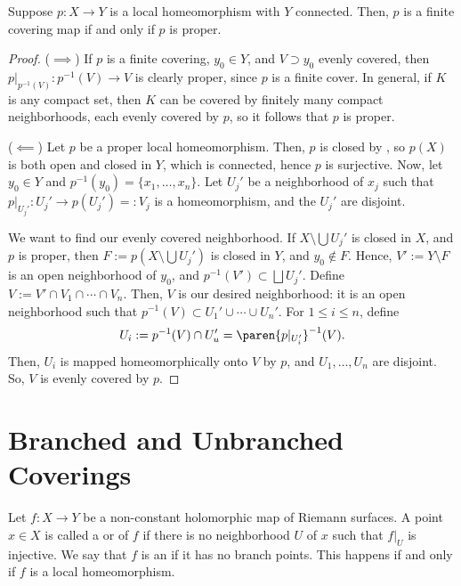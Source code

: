 \documentclass[11pt]{report}
\begin{document}
\begin{prop}
    Suppose $p:X \to Y$ is a local homeomorphism with $Y$ connected. Then, $p$ is a finite covering map if and only if $p$ is proper.
\end{prop}

\begin{proof}
    \hfill \break
    ($\implies$) If $p$ is a finite covering, $y_0 \in Y$, and $V\supset y_0$ evenly covered, then $p|_{p^{-1}(V)}:p^{-1}(V) \to V$ is clearly proper, since $p$ is a finite cover. In general, if $K$ is any compact set, then $K$ can be covered by finitely many compact neighborhoods, each evenly covered by $p$, so it follows that $p$ is proper.  

    ($\impliedby$) Let $p$ be a proper local homeomorphism. Then, $p$ is closed by , so $p(X)$ is both open and closed in $Y$, which is connected, hence $p$ is surjective. Now, let $y_0 \in Y$ and $p^{-1}(y_0)=\{x_1,\dots,x_n\}$. Let $U_j'$ be a neighborhood of $x_j$ such that $p|_{U_j'}:U_j' \to p(U_j')=:V_j$ is a homeomorphism, and the $U_j'$ are disjoint.

    We want to find our evenly covered neighborhood. If $X \setminus \bigcup U_j'$ is closed in $X$, and $p$ is proper, then $F:=p(X \setminus \bigcup U_j')$ is closed in $Y$, and $y_0 \not \in F$. Hence, $V':=Y\setminus F$ is an open neighborhood of $y_0$, and $p^{-1}(V') \subset \bigsqcup U_j'$. Define $V:= V' \cap V_1 \cap \cdots \cap V_n$. Then, $V$ is our desired neighborhood: it is an open neighborhood such that $p^{-1}(V) \subset U_1' \cup \cdots \cup U_n'$. For $1 \leq i \leq n$, define
    $$U_i:= p^{-1}(V) \cap U_u' = \paren{p|_{U_i'}}^{-1}(V).$$
    Then, $U_i$ is mapped homeomorphically onto $V$ by $p$, and $U_1,\dots,U_n$ are disjoint. So, $V$ is evenly covered by $p$.
\end{proof}

\section{Branched and Unbranched Coverings}

\begin{defn}
    Let $f:X \to Y$ be a non-constant holomorphic map of Riemann surfaces. A point $x \in X$ is called a  or  of $f$ if there is no neighborhood $U$ of $x$ such that $f|_U$ is injective. We say that $f$ is an  if it has no branch points. This happens if and only if $f$ is a local homeomorphism. 
\end{defn}
\end{document}
